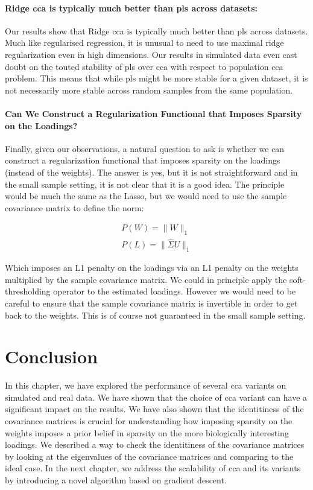 \paragraph{Ridge \acrshort{cca} is typically much better than \acrshort{pls} across datasets:} Our results show that Ridge \acrshort{cca} is typically much better than \acrshort{pls} across datasets.
Much like regularised regression, it is unusual to need to use maximal ridge regularization even in high dimensions.
Our results in simulated data even cast doubt on the touted stability of \acrshort{pls} over \acrshort{cca} with respect to population \acrshort{cca} problem.
This means that while \acrshort{pls} might be more stable for a given dataset, it is not necessarily more stable across random samples from the same population.

\paragraph{Can We Construct a Regularization Functional that Imposes Sparsity on the Loadings?}
Finally, given our observations, a natural question to ask is whether we can construct a regularization functional that imposes sparsity on the \gls{loadings} (instead of the weights).
The answer is yes, but it is not straightforward and in the small sample setting, it is not clear that it is a good idea.
The principle would be much the same as the Lasso, but we would need to use the sample covariance matrix to define the norm:

\begin{align}
    P(W)=\|W\|_1 \\
    P(L)=\|\hat{\Sigma}U\|_1
\end{align}

Which imposes an L1 penalty on the \gls{loadings} via an L1 penalty on the \gls{weights} multiplied by the sample covariance matrix.
We could in principle apply the soft-thresholding operator to the estimated loadings.
However we would need to be careful to ensure that the sample covariance matrix is invertible in order to get back to the weights.
This is of course not guaranteed in the small sample setting.

\section{Conclusion}

In this chapter, we have explored the performance of several \acrshort{cca} variants on simulated and real data.
We have shown that the choice of \acrshort{cca} variant can have a significant impact on the results.
We have also shown that the identitiness of the covariance matrices is crucial for understanding how imposing sparsity on the \gls{weights} imposes a prior belief in sparsity on the more biologically interesting loadings.
We described a way to check the identitiness of the covariance matrices by looking at the eigenvalues of the covariance matrices and comparing to the ideal case.
In the next chapter, we address the scalability of \acrshort{cca} and its variants by introducing a novel algorithm based on gradient descent.